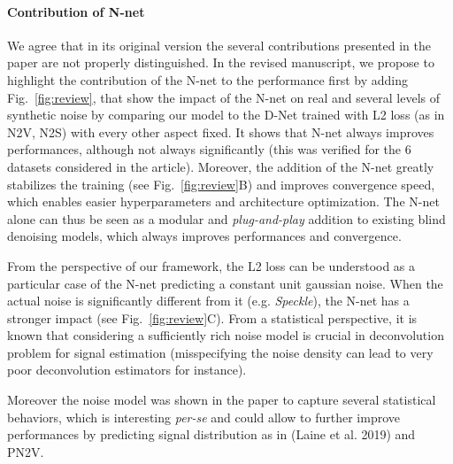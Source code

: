 \documentclass{article}
\begin{document}
\paragraph{Contribution of N-net}
We agree that in its original version the several contributions presented in the paper are not properly distinguished.
In the revised manuscript, we propose to highlight the contribution of the N-net to the performance first by adding Fig.~\ref{fig:review}, that show the impact of the N-net on real and several levels of synthetic noise by comparing our model to the D-Net trained with L2 loss (as in N2V, N2S) with every other aspect fixed.
It shows that N-net always improves performances, although not always significantly (this was verified for the 6 datasets considered in the article). Moreover, the addition of the N-net greatly stabilizes the training (see Fig.~\ref{fig:review}B) and improves convergence speed, which enables easier hyperparameters and architecture optimization.
The N-net alone can thus be seen as a modular and \textit{plug-and-play} addition to existing blind denoising models, which always improves performances and convergence.

From the perspective of our framework, the L2 loss can be understood as a particular case of the N-net predicting a constant unit gaussian noise. When the actual noise is significantly different from it (e.g. \textit{Speckle}), the N-net has a stronger impact (see Fig.~\ref{fig:review}C).
From a statistical perspective,  it is known that considering a sufficiently rich noise model is crucial in deconvolution problem for signal estimation (misspecifying the noise density can lead to very poor deconvolution estimators for instance).

Moreover the noise model was shown in the paper to capture several statistical behaviors, which is interesting \textit{per-se} and could allow to further improve performances by predicting signal distribution as in (Laine et al. 2019) and PN2V.
\end{document}
